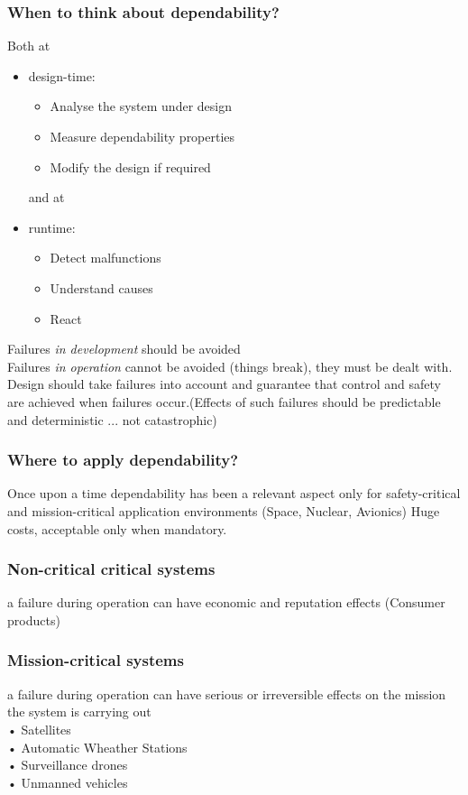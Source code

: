 \documentclass[10pt, oneside]{article}
\begin{document}
\subsubsection{When to think about dependability?}
Both at \begin{itemize}
    \item design-time: \begin{itemize}
        \item Analyse the system under design 
        \item Measure dependability properties 
        \item Modify the design if required
    \end{itemize}
    and at
    \item runtime: \begin{itemize}
        \item Detect malfunctions
        \item Understand causes 
        \item React
    \end{itemize}
\end{itemize}
Failures {\sl in development} should be avoided\\
Failures {\sl in operation} cannot be avoided (things break), they must be dealt with.\\Design should take failures into account and guarantee that control and safety are achieved when failures occur.(Effects of such failures should be predictable and deterministic ... not catastrophic)
\subsubsection{Where to apply dependability?}Once upon a time dependability has been a relevant aspect only for safety-critical and mission-critical application environments (Space, Nuclear, Avionics)
Huge costs, acceptable only when mandatory.
\subsubsection*{Non-critical critical systems}a failure during operation can have economic and reputation effects
(Consumer products)
\subsubsection*{Mission-critical systems}a failure during operation can have serious or irreversible effects on the mission the system is carrying out\\
• Satellites\\
• Automatic Wheather Stations\\
• Surveillance drones\\
• Unmanned vehicles
\end{document}
